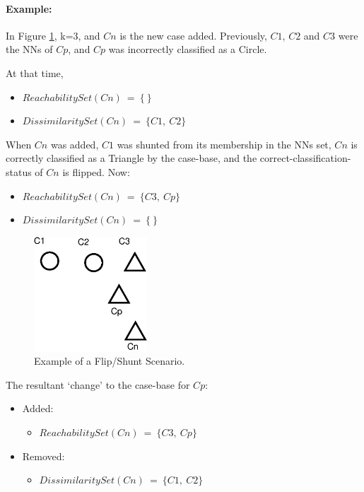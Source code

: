 \documentclass[a4paper,11pt]{report}
\begin{document}
\paragraph{Example:} In Figure \ref{fig:flipprecedence}, k=3, and $Cn$ is the new case added. Previously, $C1$, $C2$ and $C3$ were the NNs of $Cp$, and $Cp$ was incorrectly classified as a Circle. 

At that time,
\begin{itemize}
	\item $ReachabilitySet(Cn)~=~\{~\}$
	\item $DissimilaritySet(Cn)~=~\{C1,~C2\}$
\end{itemize}

\begin{samepage}
When $Cn$ was added, $C1$ was shunted from its membership in the NNs set, $Cn$ is correctly classified as a Triangle by the case-base, and the correct-classification-status of $Cn$ is flipped. Now:
\begin{itemize}
	\item $ReachabilitySet(Cn)~=~\{C3,~Cp\}$
	\item $DissimilaritySet(Cn)~=~\{~\}$
\end{itemize}
\end{samepage}

\begin{figure}[h!] \centering
\includegraphics[width=120pt]{./Drawn/FlipPrecedence}
\caption{Example of a Flip/Shunt Scenario.}
\label{fig:flipprecedence}
\end{figure}

The resultant `change' to the case-base for $Cp$:
\begin{itemize}
	\item Added: 
	\begin{itemize}
		\item $ReachabilitySet(Cn)~=~\{C3,~Cp\}$
	\end{itemize}
	\item Removed:
	\begin{itemize}
		\item $DissimilaritySet(Cn)~=~\{C1,~C2\}$
	\end{itemize}
\end{itemize}
\end{document}
